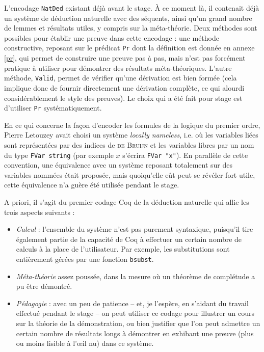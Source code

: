 \documentclass[a4paper]{article}
\theoremstyle{remark}
\theoremstyle{remark}
\theoremstyle{remark}
\theoremstyle{definition}
\theoremstyle{definition}
\theoremstyle{definition}
\begin{document}
L'encodage \verb+NatDed+ existant déjà avant le stage. \`A ce moment là, il contenait déjà un système de déduction naturelle avec des séquents, ainsi qu'un grand nombre de lemmes et résultats utiles, y compris sur la méta-théorie. Deux méthodes sont possibles pour établir une preuve dans cette encodage : une méthode constructive, reposant sur le prédicat \verb+Pr+ dont la définition est donnée en annexe \ref{pr}, qui permet de construire une preuve pas à pas, mais n'est pas forcément pratique à utiliser pour démontrer des résultats méta-théoriques. L'autre méthode, \verb+Valid+, permet de vérifier qu'une dérivation est bien formée (cela implique donc de fournir directement une dérivation complète, ce qui alourdi considérablement le style des preuves). Le choix qui a été fait pour stage est d'utiliser \verb+Pr+ systématiquement.

En ce qui concerne la façon d'encoder les formules de la logique du premier ordre, Pierre Letouzey avait choisi un système \emph{locally nameless}, i.e. où les variables liées sont représentées par des indices de \textsc{de Bruijn} et les variables libres par un nom du type \verb+FVar string+ (par exemple $x$ s'écrira \verb+FVar "x"+). En parallèle de cette convention, une équivalence avec un système reposant totalement sur des variables nommées était proposée, mais quoiqu'elle eût peut se révéler fort utile, cette équivalence n'a guère été utilisée pendant le stage.
\medskip

A priori, il s'agit du premier codage Coq de la déduction naturelle qui allie les trois aspects suivants :
\begin{itemize}
\item \emph{Calcul} : l'ensemble du système n'est pas purement syntaxique, puisqu'il tire également partie de la capacité de Coq à effectuer un certain nombre de calculs à la place de l'utilisateur. Par exemple, les substitutions sont entièrement gérées par une fonction \verb+bsubst+.
\item \emph{Méta-théorie} assez poussée, dans la mesure où un théorème de complétude a pu être démontré.
\item \emph{Pédagogie} : avec un peu de patience -- et, je l'espère, en s'aidant du travail effectué pendant le stage -- on peut utiliser ce codage pour illustrer un cours sur la théorie de la démonstration, ou bien justifier que l'on peut admettre un certain nombre de résultats longs à démontrer en exhibant une preuve (plus ou moins lisible à l'\oe il nu) dans ce système.
\end{itemize}
\end{document}
